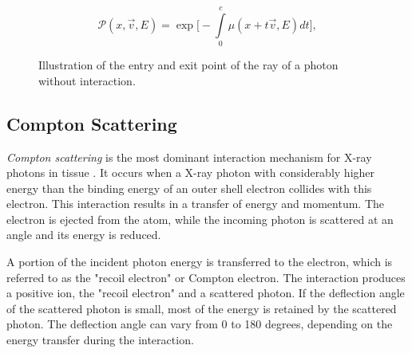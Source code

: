 $$\mathcal{P}(x, \vec{v}, E) = \exp \bigg[ -\int\limits_{0}^{c}{\mu(x+t\vec{v}, E)} dt \bigg],$$

\begin{figure}[H]
    \centering
    \caption{Illustration of the entry and exit point of the ray of a photon without interaction.}
    \label{fig:exit_point}
\end{figure}



\subsection{Compton Scattering}
\label{sec:physicsComptonScattering}
\emph{Compton scattering} is the most dominant interaction mechanism for X-ray
photons in tissue \cite[Chap. 7]{medicalImagingSystemsIntro2019:}. It occurs
when a X-ray photon with considerably higher energy than the binding energy of an outer shell electron collides with this electron. This interaction
results in a transfer of energy and momentum. The electron is ejected from the atom, while the incoming photon is scattered at an
angle and its energy is reduced.

A portion of the incident photon energy is transferred to the electron, which
is referred to as the "recoil electron" or Compton electron. The interaction
produces a positive ion, the "recoil electron" and a scattered photon. If the deflection angle of the scattered photon is small, most of the energy is retained by the scattered photon. The deflection angle can vary from 0 to 180 degrees, depending on the energy transfer during the interaction.


